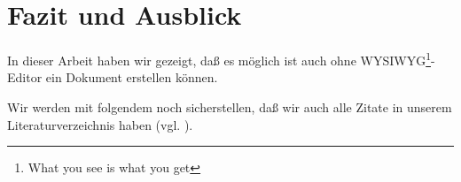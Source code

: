 \chapter{Fazit und Ausblick}

In dieser Arbeit haben wir gezeigt, daß es möglich ist auch ohne WYSIWYG\footnote{What you see is what you get}-Editor ein Dokument erstellen können.

Wir werden mit folgendem noch sicherstellen, daß wir auch alle Zitate in unserem Literaturverzeichnis haben (vgl. \cite{abel92, badura09, burrows05}).